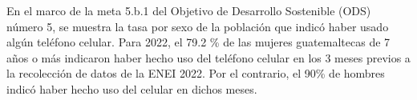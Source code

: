 En el marco de la meta 5.b.1 del Objetivo de Desarrollo Sostenible (ODS) número 5, se muestra la tasa por sexo de la población que indicó haber usado algún teléfono celular. Para 2022, el 79.2 \% de las mujeres guatemaltecas de 7 años o más indicaron haber hecho uso del teléfono celular en los 3 meses previos a la recolección de datos de la ENEI 2022. Por el contrario, el 90\% de hombres indicó haber hecho uso del celular en dichos meses. 
